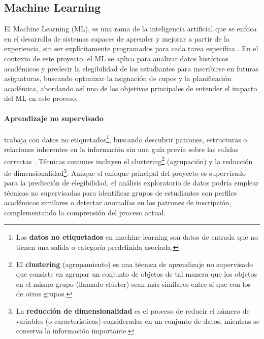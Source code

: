 \subsection{Machine Learning}
El Machine Learning (ML), es una rama de la inteligencia artificial que se enfoca en el desarrollo de sistemas capaces de aprender y mejorar a partir de la experiencia, sin ser explícitamente programados para cada tarea específica \parencite{Samuel1959}.
En el contexto de este proyecto, el ML se aplica para analizar datos históricos académicos y predecir la elegibilidad de los estudiantes para inscribirse en futuras asignaturas, buscando optimizar la asignación de cupos y la planificación académica, abordando así uno de los objetivos principales de entender el impacto del ML en este proceso.

\paragraph{Aprendizaje no supervisado}
trabaja con datos no etiquetados\footnote{Los \textbf{datos no etiquetados} en machine learning son datos de entrada que no tienen una salida o categoría predefinida asociada.}, buscando descubrir patrones, estructuras o relaciones inherentes en la información sin una guía previa sobre las salidas correctas \parencite{Hastie2009}.
Técnicas comunes incluyen el clustering\footnote{El \textbf{clustering} (agrupamiento) es una técnica de aprendizaje no supervisado que consiste en agrupar un conjunto de objetos de tal manera que los objetos en el mismo grupo (llamado clúster) sean más similares entre sí que con los de otros grupos.} (agrupación) y la reducción de dimensionalidad\footnote{La \textbf{reducción de dimensionalidad} es el proceso de reducir el número de variables (o características) consideradas en un conjunto de datos, mientras se conserva la información importante.}.
Aunque el enfoque principal del proyecto es supervisado para la predicción de elegibilidad, el análisis exploratorio de datos podría emplear técnicas no supervisadas para identificar grupos de estudiantes con perfiles académicos similares o detectar anomalías en los patrones de inscripción, complementando la comprensión del proceso actual.

